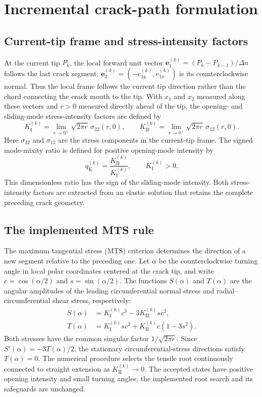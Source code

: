 \documentclass[pdflatex,sn-mathphys-num]{sn-jnl}
\begin{document}
\section{Incremental crack-path formulation}
\label{sec:recurrence}
\subsection{Current-tip frame and stress-intensity factors}
At the current tip $P_k$, the local forward unit vector
$\bm e_1^{(k)}=(P_k-P_{k-1})/\Delta a$ follows the last crack
segment; $\bm e_2^{(k)}=(-e_{1y}^{(k)},e_{1x}^{(k)})$ is its
counterclockwise normal. Thus the local frame follows the current
tip direction rather than the chord connecting the crack mouth to the
tip. With $x_1$ and $x_2$ measured along these vectors and $r>0$
measured directly ahead of the tip, the opening- and sliding-mode
stress-intensity factors are defined by
\begin{equation}
 K_{\mathrm{I}}^{(k)}=\lim_{r\to0^+}\sqrt{2\pi r}\,\sigma_{22}(r,0),
 \qquad
 K_{\mathrm{II}}^{(k)}=\lim_{r\to0^+}\sqrt{2\pi r}\,\sigma_{12}(r,0).
 \label{eq:sifdefinition}
\end{equation}
Here $\sigma_{22}$ and $\sigma_{12}$ are the stress components in
the current-tip frame. The signed mode-mixity ratio is defined for
positive opening-mode intensity by
\begin{equation}
 q_{\mathrm{K}}^{(k)}
 =\frac{K_{\mathrm{II}}^{(k)}}{K_{\mathrm{I}}^{(k)}},
 \qquad K_{\mathrm{I}}^{(k)}>0.
 \label{eq:mode-mixity}
\end{equation}
This dimensionless ratio has the sign of the sliding-mode intensity.
Both stress-intensity factors are extracted from an elastic solution
that retains the complete preceding crack geometry.

\subsection{The implemented MTS rule}
The maximum tangential stress (MTS) criterion determines the direction
of a new segment relative to the preceding one. Let $\alpha$ be the
counterclockwise turning angle in local polar coordinates centered at
the crack tip, and write $c=\cos(\alpha/2)$ and
$s=\sin(\alpha/2)$. The functions $S(\alpha)$ and $T(\alpha)$ are
the angular amplitudes of the leading circumferential normal stress
and radial--circumferential shear stress, respectively:
\begin{align}
 S(\alpha)&=K_{\mathrm{I}}^{(k)}c^3
             -3K_{\mathrm{II}}^{(k)}s c^2,\label{eq:stt}\\
 T(\alpha)&=K_{\mathrm{I}}^{(k)}s c^2
             +K_{\mathrm{II}}^{(k)}c(1-3s^2).
 \label{eq:trt}
\end{align}
Both stresses have the common singular factor $1/\sqrt{2\pi r}$.
Since $S'(\alpha)=-3T(\alpha)/2$, the stationary circumferential-stress
directions satisfy $T(\alpha)=0$. The numerical procedure selects the
tensile root continuously connected to straight extension as
$K_{\mathrm{II}}^{(k)}\to0$. The accepted states have positive opening
intensity and small turning angles; the implemented root search and
its safeguards are unchanged.
\end{document}
